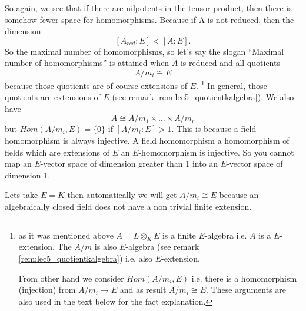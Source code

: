 So again, we see that if there are nilpotents in the tensor product,
then there is somehow fewer space for homomorphisms. Because if A is
not reduced, then the dimension
\[
\left[A_{red} : E\right] < \left[A : E\right].
\]
So the maximal number of homomorphisms, so let's say the slogan
``Maximal number of homomorphisms'' is attained when $A$ is reduced
and all quotients
\begin{equation}
  A/m_i \cong E
  \label{eq:lec5_1}
\end{equation}
because those quotients are of
course extensions of $E$.
\footnote{
  as it was mentioned above $A = L \otimes_K E$ is a finite
  $E$-algebra i.e. $A$ is a $E$-extension. The $A/m$ is also
  $E$-algebra (see remark
  \ref{rem:lec5_quotientkalgebra}) i.e. also $E$-extension.

  From other hand we consider $Hom\left(A/m_i, E\right)$ i.e. there is
  a homomorphism (injection) from $A/m_i \to E$ and as result
  $A/m_i \cong E$. These arguments are also used in the text below for
  the fact explanation. 
}
In general,    
those quotients are extensions of $E$ (see remark
  \ref{rem:lec5_quotientkalgebra}). We also have
\[
A \cong A/m_1 \times \dots \times A/m_r
\]
but $Hom\left(A/m_i, E\right) = \{0\}$ if $\left[A/m_i: E\right] > 1$.  
This is because a field homomorphism is always injective. A field
homomorphism a homomorphism of fields which are extensions of $E$  an
$E$-homomorphism is injective. So you cannot map an $E$-vector space of
dimension greater than 1 into an $E$-vector space of dimension 1.

Lets take $E = \bar{K}$ then automatically we will get
$A/m_i \cong E$ because an algebraically closed field does not have a
non trivial finite extension.


